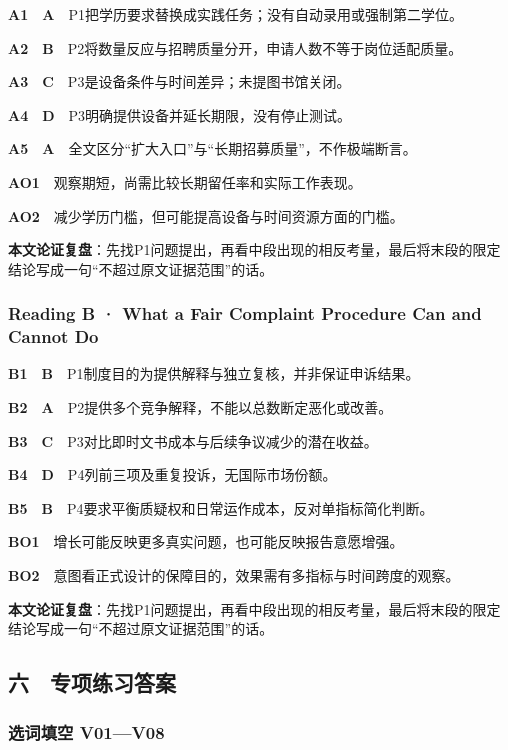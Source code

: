 \documentclass[
  11pt,
]{ctexart}
\begin{document}
\textbf{A1　A}　P1把学历要求替换成实践任务；没有自动录用或强制第二学位。

\textbf{A2　B}　P2将数量反应与招聘质量分开，申请人数不等于岗位适配质量。

\textbf{A3　C}　P3是设备条件与时间差异；未提图书馆关闭。

\textbf{A4　D}　P3明确提供设备并延长期限，没有停止测试。

\textbf{A5　A}　全文区分``扩大入口''与``长期招募质量''，不作极端断言。

\textbf{AO1}　观察期短，尚需比较长期留任率和实际工作表现。

\textbf{AO2}　减少学历门槛，但可能提高设备与时间资源方面的门槛。

\textbf{本文论证复盘}：先找P1问题提出，再看中段出现的相反考量，最后将末段的限定结论写成一句``不超过原文证据范围''的话。

\subsubsection{Reading B · What a Fair Complaint Procedure Can and
Cannot
Do}\label{reading-b-what-a-fair-complaint-procedure-can-and-cannot-do-1}

\textbf{B1　B}　P1制度目的为提供解释与独立复核，并非保证申诉结果。

\textbf{B2　A}　P2提供多个竞争解释，不能以总数断定恶化或改善。

\textbf{B3　C}　P3对比即时文书成本与后续争议减少的潜在收益。

\textbf{B4　D}　P4列前三项及重复投诉，无国际市场份额。

\textbf{B5　B}　P4要求平衡质疑权和日常运作成本，反对单指标简化判断。

\textbf{BO1}　增长可能反映更多真实问题，也可能反映报告意愿增强。

\textbf{BO2}　意图看正式设计的保障目的，效果需有多指标与时间跨度的观察。

\textbf{本文论证复盘}：先找P1问题提出，再看中段出现的相反考量，最后将末段的限定结论写成一句``不超过原文证据范围''的话。

\subsection{六　专项练习答案}\label{ux516d-ux4e13ux9879ux7ec3ux4e60ux7b54ux6848}

\subsubsection{选词填空
V01---V08}\label{ux9009ux8bcdux586bux7a7a-v01v08}
\end{document}
